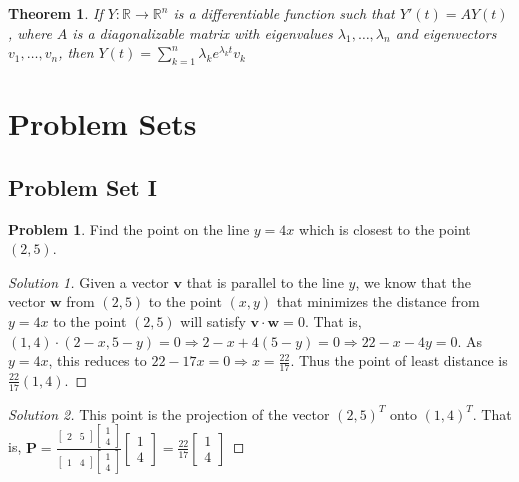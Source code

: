 \documentclass[oneside]{book}
\newtheorem{theorem}{Theorem}[section]
\theoremstyle{definition}
\newtheorem{problem}{Problem}[section]
\newcommand*\B[1]{\mathbf{#1}}
\begin{document}
\begin{theorem}
If $Y:\mathbb{R}\rightarrow \mathbb{R}^n$ is a differentiable function such that $Y'(t) = AY(t)$, where $A$ is a diagonalizable matrix with eigenvalues $\lambda_1,\hdots, \lambda_n$ and eigenvectors $v_1,\hdots, v_n$, then $Y(t) = \sum_{k=1}^{n} \lambda_k e^{\lambda_k t}v_k$
\end{theorem}


\section{Problem Sets}

\subsection*{Problem Set I}

\begin{problem}
Find the point on the line $y=4x$ which is closest to the point $(2,5)$.
\end{problem}
\begin{proof}[Solution 1]
Given a vector $\B{v}$ that is parallel to the line $y$, we know that the vector $\B{w}$ from $(2,5)$ to the point $(x,y)$ that minimizes the distance from $y=4x$ to the point $(2,5)$ will satisfy $\B{v}\cdot \B{w} = 0$. That is, $(1,4)\cdot (2-x,5-y) = 0\Rightarrow 2-x+4(5-y) = 0 \Rightarrow 22 - x - 4 y = 0$. As $y = 4x$, this reduces to $22-17x = 0 \Rightarrow x= \frac{22}{17}$. Thus the point of least distance is $\frac{22}{17}(1,4)$.
\end{proof}
\begin{proof}[Solution 2]
This point is the projection of the vector $(2,5)^T$ onto $(1,4)^T$. That is, $\B{P} = \frac{\begin{bmatrix}2 & 5 \end{bmatrix} \begin{bmatrix} 1 \\ 4 \end{bmatrix}}{\begin{bmatrix} 1 & 4 \end{bmatrix} \begin{bmatrix} 1 \\ 4 \end{bmatrix}} \begin{bmatrix} 1 \\ 4 \end{bmatrix} = \frac{22}{17} \begin{bmatrix} 1 \\ 4\end{bmatrix}$
\end{proof}
\end{document}
